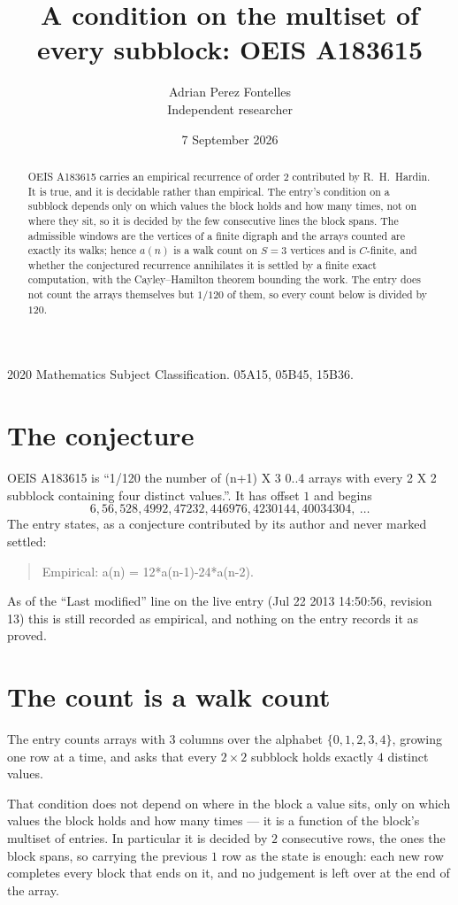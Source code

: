 \documentclass[11pt,a4paper]{article}
\title{A condition on the multiset of every subblock: OEIS A183615}
\author{Adrian Perez Fontelles\\ \small Independent researcher}
\date{7 September 2026}
\theoremstyle{plain}
\theoremstyle{definition}
\begin{document}
\maketitle

\begin{abstract}
OEIS A183615 carries an empirical recurrence of order $2$ contributed by R.~H.~Hardin. It is
true, and it is decidable rather than empirical. The entry's condition on a subblock depends
only on which values the block holds and how many times, not on where they sit, so it is
decided by the few consecutive lines the block spans. The admissible windows are the vertices
of a finite digraph and the arrays counted are exactly its walks; hence $a(n)$ is a walk count
on $S=3$ vertices and is $C$-finite, and whether the conjectured recurrence annihilates it
is settled by a finite exact computation, with the Cayley--Hamilton theorem bounding the
work. The entry does not count the arrays themselves but $1/120$ of them, so every count below is divided by $120$.
\end{abstract}

\noindent\small 2020 Mathematics Subject Classification. 05A15, 05B45, 15B36.\normalsize

\section{The conjecture}

OEIS A183615 is ``1/120 the number of (n+1) X 3 0..4 arrays with every 2 X 2 subblock containing four distinct values.''. It has offset $1$ and begins
\[
6, 56, 528, 4992, 47232, 446976, 4230144, 40034304,\ \dots
\]
The entry states, as a conjecture contributed by its author and never marked settled:
\begin{quote}
Empirical: a(n) = 12*a(n-1)-24*a(n-2).
\end{quote}
As of the ``Last modified'' line on the live entry (Jul 22 2013 14:50:56, revision 13) this is still
recorded as empirical, and nothing on the entry records it as proved.

\section{The count is a walk count}

The entry counts arrays with $3$ columns over the alphabet $\{0,1,2,3,4\}$, growing one row at a time, and asks that every $2\times2$ subblock holds exactly $4$ distinct values.

That condition does not depend on where in the block a value sits, only on which values the block holds and how many times --- it is a function of the block's multiset of entries. In particular it is decided by $2$ consecutive rows, the ones the block spans, so carrying the previous $1$ row as the state is enough: each new row completes every block that ends on it, and no judgement is left over at the end of the array.
\end{document}
